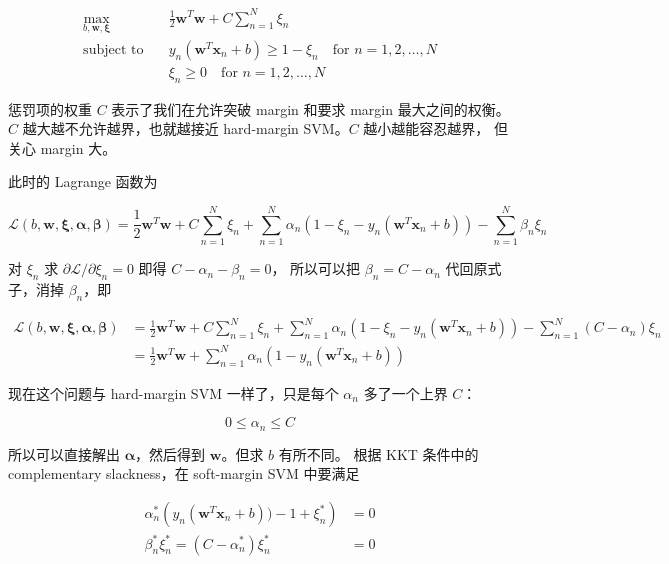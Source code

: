 \documentclass[a4paper]{article}
\begin{document}
\begin{equation}
\begin{aligned}
\max_{b, \mathbf{w}, \mathbf{\xi}} &\quad \frac{1}{2} \mathbf{w}^T\mathbf{w} + C \sum_{n=1}^{N}\xi_n \\
\text{subject to} &\quad y_n(\mathbf{w}^{T}\mathbf{x}_n + b) \ge 1 - \xi_n \quad \text{for } n = 1, 2, \dots, N \\
                  &\quad \xi_n \ge 0 \quad \text{for } n = 1, 2, \dots, N
\end{aligned}
\end{equation}

惩罚项的权重 $C$ 表示了我们在允许突破 margin 和要求 margin 最大之间的权衡。
$C$ 越大越不允许越界，也就越接近 hard-margin SVM。$C$ 越小越能容忍越界，
但关心 margin 大。

此时的 Lagrange 函数为

$$\mathcal{L}(b, \mathbf{w}, \bm{\xi}, \bm{\alpha}, \bm{\beta}) = \frac{1}{2}\mathbf{w}^T\mathbf{w} + C \sum_{n=1}^{N}\xi_n + \sum_{n=1}^{N}\alpha_n(1 - \xi_n - y_n(\mathbf{w}^T\mathbf{x}_n + b)) - \sum_{n=1}^{N}\beta_n\xi_n$$

对 $\xi_n$ 求 $\partial\mathcal{L}/\partial\xi_n = 0$ 即得 $C - \alpha_n - \beta_n = 0$，
所以可以把 $\beta_n = C - \alpha_n$ 代回原式子，消掉 $\beta_n$，即

\begin{equation}
\begin{aligned}
\mathcal{L}(b, \mathbf{w}, \bm{\xi}, \bm{\alpha}, \bm{\beta}) &= \frac{1}{2}\mathbf{w}^T\mathbf{w} + C \sum_{n=1}^{N}\xi_n + \sum_{n=1}^{N}\alpha_n(1 - \xi_n - y_n(\mathbf{w}^T\mathbf{x}_n + b)) - \sum_{n=1}^{N}(C - \alpha_n)\xi_n \\
                                                              &= \frac{1}{2}\mathbf{w}^T\mathbf{w} + \sum_{n=1}^{N}\alpha_n(1 - y_n(\mathbf{w}^T\mathbf{x}_n + b))
\end{aligned}
\end{equation}

现在这个问题与 hard-margin SVM 一样了，只是每个 $\alpha_n$ 多了一个上界 $C$：

$$0 \le \alpha_n \le C$$

所以可以直接解出 $\bm{\alpha}$，然后得到 $\mathbf{w}$。但求 $b$ 有所不同。
根据 KKT 条件中的 complementary slackness，在 soft-margin SVM 中要满足

\begin{equation}
\begin{aligned}
\alpha_n^{*} \left ( y_n(\mathbf{w}^T\mathbf{x}_n + b)) - 1 + \xi_n^{*} \right ) &= 0 \\
\beta_n^{*} \xi_n^{*} = (C - \alpha_n^{*}) \xi_n^{*} &= 0
\end{aligned}
\end{equation}
\end{document}
